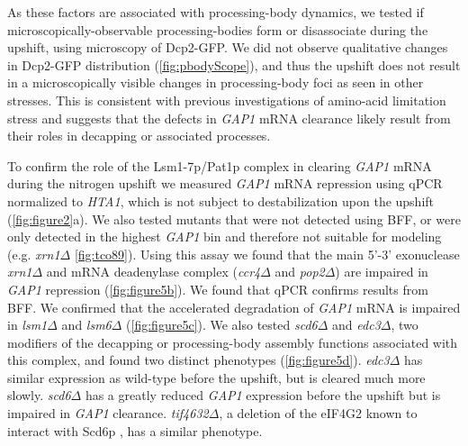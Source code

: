 As these factors are associated with processing-body dynamics, 
we tested if microscopically-observable processing-bodies form or
disassociate during the upshift, using microscopy of Dcp2-GFP. 
We did not observe qualitative changes
in Dcp2-GFP distribution (\autoref{fig:pbodyScope}),
and thus the upshift does not
result in a microscopically visible changes in processing-body foci
as seen in other stresses. This is consistent with previous
investigations of amino-acid limitation stress
\parencite{hoyle2007stress} and
suggests that the defects in \textit{GAP1} mRNA clearance likely 
result from their roles in decapping or associated processes.


To confirm the role of the Lsm1-7p/Pat1p  complex in clearing \textit{GAP1}
mRNA during the nitrogen upshift we measured \textit{GAP1} mRNA
repression using qPCR normalized to
\textit{HTA1}, which is not subject to destabilization upon the upshift
(\autoref{fig:figure2}a). We also tested mutants that were not detected using BFF,
or were only detected in the highest \textit{GAP1} bin and therefore
not suitable for modeling
(e.g. \textit{xrn1}$\Delta$ \autoref{fig:tco89}). 
Using this assay we found that the main 5’-3’ 
exonuclease \textit{xrn1}$\Delta$ 
and mRNA deadenylase complex (\textit{ccr4}$\Delta$ and
\textit{pop2}$\Delta$) are impaired in \textit{GAP1} repression 
(\autoref{fig:figure5b}).
We found that qPCR confirms results from BFF.
We confirmed that the accelerated degradation of \textit{GAP1} mRNA is impaired
in \textit{lsm1}$\Delta$ and \textit{lsm6}$\Delta$ 
(\autoref{fig:figure5c}). 
We also tested
\textit{scd6}$\Delta$ and \textit{edc3}$\Delta$, two modifiers of the
decapping or processing-body
assembly functions associated with this complex, and found two
distinct phenotypes (\autoref{fig:figure5d}). \textit{edc3}$\Delta$ has similar expression 
as wild-type before the upshift, but is cleared much more slowly.
\textit{scd6}$\Delta$ has a greatly reduced \textit{GAP1} expression
before the upshift but is impaired in \textit{GAP1} clearance. 
\textit{tif4632}$\Delta$, a deletion of the eIF4G2
known to interact with Scd6p \parencite{rajyaguru2012scd6}, 
has a similar phenotype. 

